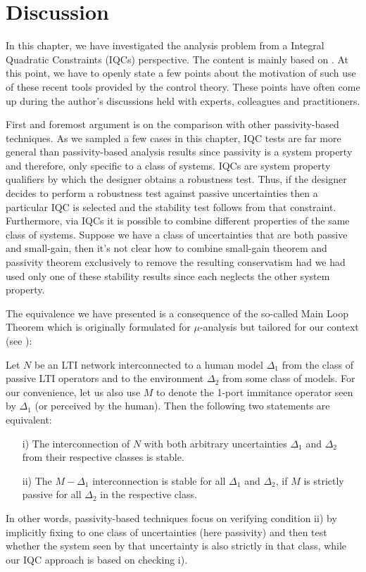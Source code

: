 \section{Discussion}



In this chapter, we have investigated the analysis problem from a Integral Quad\-ratic Constraints (IQCs) perspective. 
The content is mainly based on \cite{polattro}. At this point, we have to openly state a few points
about the motivation of such use of these recent tools provided by the control
theory. These points have often come up during the author's discussions held with experts, colleagues and
practitioners.

First and foremost argument is on the comparison with other passivity-based techniques. As we sampled a few cases
in this chapter, IQC tests are far more general than passivity-based analysis results since passivity is a 
system property and therefore, only specific to a class of systems. IQCs are system property qualifiers by which 
the designer obtains a robustness test. Thus, if the designer decides to perform a 
robustness test against passive uncertainties then a particular IQC is selected and the stability test follows
from that constraint. Furthermore, via IQCs it is possible to combine different properties of the same class 
of systems. Suppose we have a class of uncertainties that are both passive and small-gain, then it's not clear
how to combine small-gain theorem and passivity theorem exclusively to remove the resulting conservatism had we 
had used only one of these stability results since each neglects the other system property. 

The equivalence we have presented is a consequence of the so-called Main Loop Theorem which is originally formulated 
for $\mu$-analysis but tailored for our context 
(see \cite[Thm. 11.7]{zhoubook}): 
\begin{thm}
Let $N$ be an LTI network interconnected to a human model $\Delta_1$ from the 
class of passive LTI operators and to the environment $\Delta_2$ from some class of models. For our convenience, 
let us also use $M$ to denote the 1-port immitance operator seen by $\Delta_1$ (or perceived by the human). 
Then the following two statements are equivalent:
\begin{enumerate}
	\item[i)] The interconnection of $N$ with both arbitrary uncertainties $\Delta_1$ and $\Delta_2$ from their 
    respective classes is stable.
	\item[ii)] The $M-\Delta_1$ interconnection is stable for all $\Delta_1$ and $\Delta_2$, if $M$ is strictly passive for all $\Delta_2$ in the respective class.
\end{enumerate}
\end{thm}
In other words, passivity-based techniques focus on verifying condition ii) by implicitly fixing to one class of 
uncertainties (here passivity) and then test whether the system seen by that uncertainty is also strictly in that
class, while our IQC approach is based on checking i).

